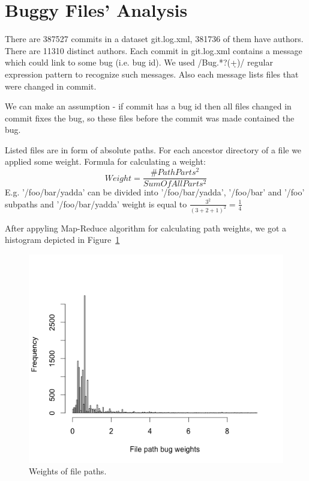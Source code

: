 \documentclass[a4paper,11pt]{article}
\begin{document}
\section{Buggy Files' Analysis}

There are 387527 commits in a dataset git.log.xml, 381736 of them have authors. There are 11310 distinct authors. Each commit in git.log.xml contains a message which could link to some bug
(i.e. bug id). We used /Bug.*?(\d+)/ regular expression pattern to recognize such messages. Also
each message lists files that were changed in commit.

We can make an
assumption - if commit has a bug id then all files changed in commit fixes the
bug, so these files before the commit was made contained the bug.

Listed files are in form of absolute paths. For each ancestor directory of a file
we applied some weight. Formula for calculating a weight:
\[Weight = \frac{\#PathParts^2}{SumOfAllParts^2}\] E.g.
'/foo/bar/yadda' can be divided into '/foo/bar/yadda', '/foo/bar' and '/foo'
subpaths and '/foo/bar/yadda' weight is equal to {$\frac{3^2}{(3+2+1)^2} = \frac{1}{4}$}

After appyling Map-Reduce algorithm for calculating path weights, we got a
histogram depicted in Figure~\ref{fig:bug_files}

\begin{figure}[ht!]
\centering
\includegraphics[width=1.2\textwidth]{../diagrams/bug_files.png}
\caption{Weights of file paths.}
\label{fig:bug_files}
\end{figure}
\end{document}
